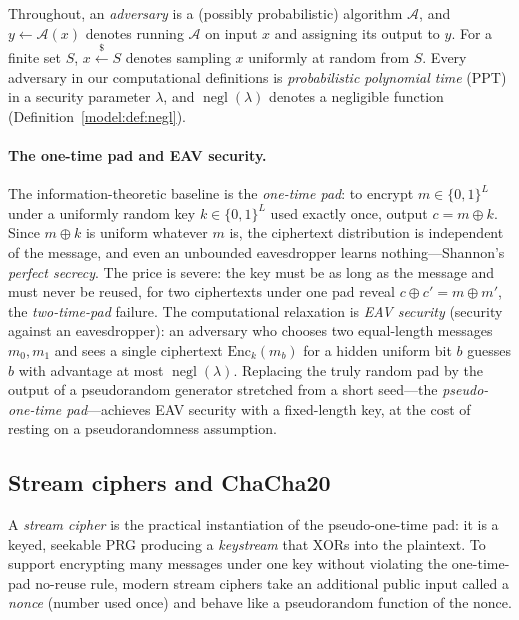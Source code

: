 \documentclass[11pt,a4paper]{article}
\theoremstyle{definition}
\theoremstyle{remark}
\DeclareMathOperator{\negl}{negl}
\begin{document}
Throughout, an \emph{adversary} is a (possibly probabilistic) algorithm \(\mathcal{A}\), and \(y \leftarrow \mathcal{A}(x)\) denotes running \(\mathcal{A}\) on input \(x\) and assigning its output to \(y\). For a finite set \(S\), \(x \xleftarrow{\$} S\) denotes sampling \(x\) uniformly at random from \(S\). Every adversary in our computational definitions is \emph{probabilistic polynomial time} (PPT) in a security parameter \(\lambda\), and \(\negl(\lambda)\) denotes a negligible function (Definition~\ref{model:def:negl}).

\paragraph{The one-time pad and EAV security.} The information-theoretic baseline is the \emph{one-time pad}: to encrypt \(m \in \{0,1\}^L\) under a uniformly random key \(k \in \{0,1\}^L\) used exactly once, output \(c = m \oplus k\). Since \(m \oplus k\) is uniform whatever \(m\) is, the ciphertext distribution is independent of the message, and even an unbounded eavesdropper learns nothing---Shannon's \emph{perfect secrecy}. The price is severe: the key must be as long as the message and must never be reused, for two ciphertexts under one pad reveal \(c \oplus c' = m \oplus m'\), the \emph{two-time-pad} failure. The computational relaxation is \emph{EAV security} (security against an eavesdropper): an adversary who chooses two equal-length messages \(m_0, m_1\) and sees a single ciphertext \(\mathrm{Enc}_k(m_b)\) for a hidden uniform bit \(b\) guesses \(b\) with advantage at most \(\negl(\lambda)\). Replacing the truly random pad by the output of a pseudorandom generator stretched from a short seed---the \emph{pseudo-one-time pad}---achieves EAV security with a fixed-length key, at the cost of resting on a pseudorandomness assumption.

\subsection{Stream ciphers and ChaCha20}

A \emph{stream cipher} is the practical instantiation of the pseudo-one-time pad: it is a keyed, seekable PRG producing a \emph{keystream} that XORs into the plaintext. To support encrypting many messages under one key without violating the one-time-pad no-reuse rule, modern stream ciphers take an additional public input called a \emph{nonce} (number used once) and behave like a pseudorandom function of the nonce.
\end{document}
